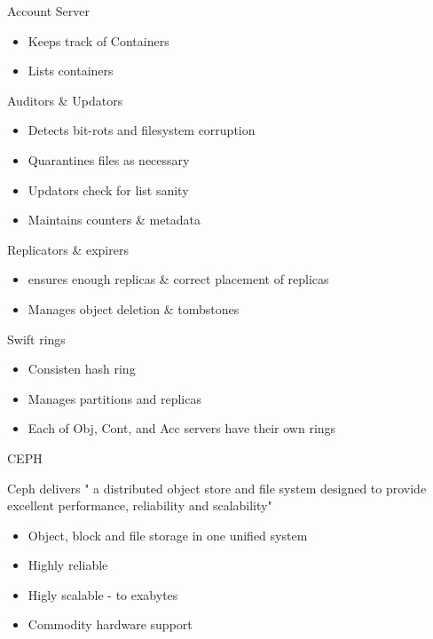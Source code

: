 \documentclass{beamer}
\begin{document}
\begin{frame}{Account Server}
\begin{itemize}
 \item Keeps track of Containers
 \item Lists containers
\end{itemize}
\end{frame}

\begin{frame}{Auditors \& Updators}
\begin{itemize}
 \item Detects bit-rots and filesystem corruption
 \item Quarantines files as necessary
 \pause
 \item Updators check for list sanity
 \item Maintains counters \& metadata
\end{itemize}
\end{frame}

\begin{frame}{Replicators \& expirers}
\begin{itemize}
 \item ensures enough replicas \& correct placement of replicas
 \pause
 \item Manages object deletion \& tombstones
\end{itemize}
\end{frame}

\begin{frame}{Swift rings}
\begin{itemize}
 \item Consisten hash ring
 \item Manages partitions and replicas
 \item Each of Obj, Cont, and Acc servers have their own rings
\end{itemize}
\end{frame}


\begin{frame}{CEPH}
\begin{definition}
Ceph delivers " a distributed object store and file system designed to provide excellent performance, reliability and scalability"
\end{definition}
\begin{itemize}
 \item Object, block and file storage in one unified system
 \item Highly reliable
 \item Higly scalable - to exabytes
 \item Commodity hardware support
\end{itemize}
\end{frame}
\end{document}

